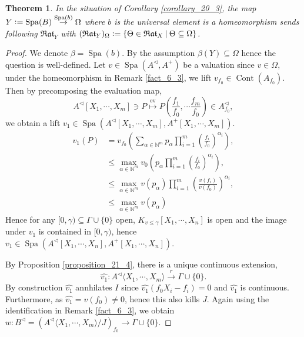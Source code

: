 \documentclass[8pt]{article}
\numberwithin{equation}{section}
\newtheorem{theorem}{Theorem} [subsection]
\DeclareMathOperator{\ev}{ev}
\DeclareMathOperator{\Spa}{Spa}
\DeclareMathOperator{\Cont}{Cont}
\newcommand{\defeq}{\vcentcolon=}
\newcommand{\N}[0]{\mathbb{N}}
\newcommand{\sep}[0]{\:|\:}
\newcommand{\Rat}[0]{\mathfrak{Rat}}
\begin{document}
\begin{theorem}
    \label{theorem_21_1}
    In the situation of Corollary \ref{corollary_20_3}, the map $Y\defeq\Spa(B)\stackrel{\Spa(b)}{\to}\Omega$ where $b$ is the universal element is a homeomorphism sends following $\Rat_Y$ with $(\Rat_Y)_\Omega \defeq\{\Theta\in\Rat_X\sep \Theta\subseteq\Omega\}$.
\end{theorem}
\begin{proof}
We denote $\beta = \Spa(b)$. By the assumption $\beta(Y)\subseteq \Omega$ hence the question is well-defined.
Let $v\in\Spa(A^\triangleleft,A^+)$ be a valuation since $v\in\Omega$, under the homeomorphism in Remark \ref{fact_6_3}, we lift $v_{f_0}\in\Cont(A_{f_0})$. 
Then by precomposing the evaluation map,
\begin{equation*}
    A^\triangleleft[X_1,\cdots,X_m]\ni P\stackrel{\ev}{\mapsto}P\left({\frac {f_1} {f_0}},\cdots{\frac {f_m} {f_0}}\right)\in A^\triangleleft_{f_0},
\end{equation*}
we obtain a lift $v_1\in\Spa(A^\triangleleft[X_1,\cdots,X_m],A^+[X_1,\cdots,X_m])$.
\begin{align*}
    v_1(P) &= v_{f_0}\left(\sum_{\alpha\in\N^m}p_\alpha\prod_{i=1}^m\left({\frac {f_i}{f_0}}\right)^{\alpha_i}\right),\\
    &\leq \max_{\alpha\in\N^m}v_0\left(p_\alpha\prod_{i=1}^m\left({\frac {f_i} {f_0}}\right)^{\alpha_i}\right),\\
    & \leq \max_{\alpha\in\N^m}v(p_\alpha)\prod_{i=1}^m\left({\frac {v(f_i)} {v(f_0)}}\right)^{\alpha_i},\\
    &\leq \max_{\alpha\in\N^m}v(p_\alpha) \tag{b}
\end{align*}
Hence for any $[0,\gamma)\subseteq\Gamma\cup\{0\}$ open, $K_{v\leq \gamma}[X_1,\cdots,X_n]$ is open and the image under $v_1$ is contained in $[0,\gamma)$, hence $v_1\in\Spa(A^\triangleleft[X_1,\cdots,X_n],A^+[X_1,\cdots,X_n])$.
\par By Proposition \ref{proposition_21_4}, there is a unique continuous extension,
\begin{equation*}
    \widehat{v_1}:A^\triangleleft\langle X_1,\cdots,X_m\rangle\stackrel{r}{\to}\Gamma\cup\{0\}.
\end{equation*}
By construction $\widehat{v_1}$ annhilates $I$ since $\widehat{v_1}(f_0X_i-f_i) = 0$ and $\widehat{v_1}$ is continuous. %
Furthermore, as $\widehat{v_1} = v(f_0) \not = 0$, hence this also kills $J$. Again using the identification in Remark \ref{fact_6_3}, we obtain $w:B^\triangleleft = (A^\triangleleft\langle X_1,\cdots,X_m\rangle/J)_{f_0}\to\Gamma\cup\{0\}$.

\end{proof}
\end{document}
